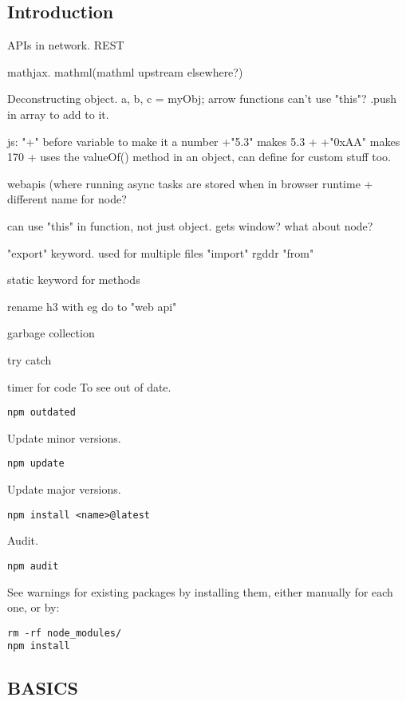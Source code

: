 
\subsection{Introduction}

APIs in network. REST

mathjax. mathml(mathml upstream elsewhere?)

Deconstructing object. {a, b, c} = myObj;
arrow functions can't use "this"?
.push in array to add to it.

js:
"+" before variable to make it a number
+"5.3" makes 5.3
+ +"0xAA" makes 170
+ uses the valueOf() method in an object, can define for custom stuff too.

webapis (where running async tasks are stored when in browser runtime
+ different name for node?

can use "this" in function, not just object. gets window? what about node?

"export" keyword. used for multiple files
"import" rgddr "from"

static keyword for methods

rename h3 with eg do to "web api"

garbage collection

try catch

timer for code
To see out of date.

\begin{verbatim}
npm outdated
\end{verbatim}

Update minor versions.

\begin{verbatim}
npm update
\end{verbatim}

Update major versions.

\begin{verbatim}
npm install <name>@latest
\end{verbatim}

Audit.

\begin{verbatim}
npm audit
\end{verbatim}

See warnings for existing packages by installing them, either manually for each one, or by:

\begin{verbatim}
rm -rf node_modules/
npm install
\end{verbatim}


\subsection{BASICS}

